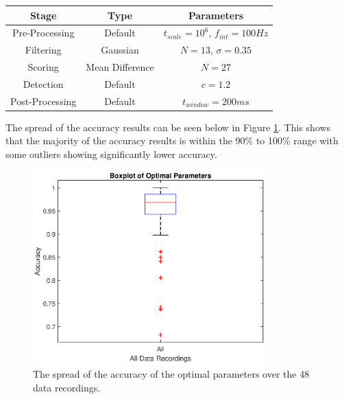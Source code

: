             \begin{center}
                \label{tbl_opt_params}
                \begin{tabular}{|c|c|c|}
                    \hline
                    Stage & Type & Parameters \\
                    \hline
                    Pre-Processing & Default & $t_{scale}=10^6$, $f_{int}=100Hz$ \\
                    Filtering & Gaussian & $N=13$, $\sigma=0.35$ \\
                    Scoring & Mean Difference & $N=27$ \\
                    Detection & Default & $c=1.2$ \\
                    Post-Processing & Default & $t_{window}=200ms$ \\
                    \hline
                \end{tabular}
            \end{center}

            The spread of the accuracy results can be seen below in Figure \ref{img_opt_params_overall}. This shows that the majority of the accuracy results is within the 90\% to 100\% range with some outliers showing significantly lower accuracy.

            \begin{figure}[!th]
                \includegraphics[width=0.8\textwidth]{Images/opt_params_overall.eps}
                \centering
                \caption{The spread of the accuracy of the optimal parameters over the 48 data recordings.}
                \label{img_opt_params_overall}
            \end{figure}

